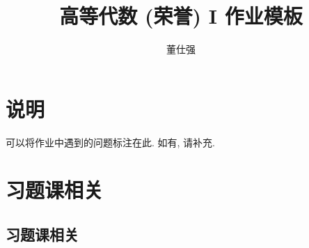 \documentclass[11pt]{ctexart}
\title{高等代数 (荣誉) I 作业模板}
\author{董仕强}
\theoremstyle{definition}
\numberwithin{equation}{section}
\begin{document}
\maketitle

\section{说明}

可以将作业中遇到的问题标注在此. 如有, 请补充.

\tableofcontents

\newpage


\section{习题课相关}

\subsection{习题课相关}
\end{document}
